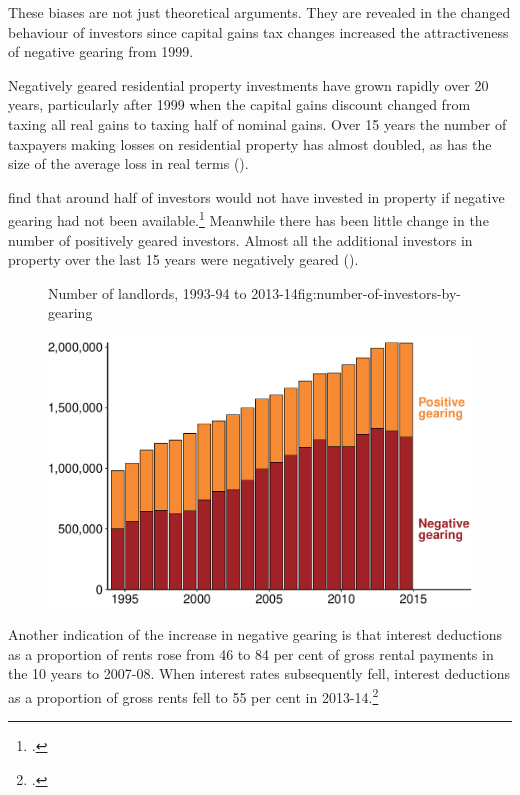 These biases are not just theoretical arguments. 
They are revealed in the changed behaviour of investors since capital gains tax changes increased the attractiveness of negative gearing from 1999.

Negatively geared residential property investments have grown rapidly over 20 years, particularly after 1999 when the capital gains discount changed from taxing all real gains to taxing half of nominal gains. 
Over 15 years the number of taxpayers making losses on residential property has almost doubled, as has the size of the average loss in real terms ().  






\textcite{seelig2009understanding} find that around half of investors would not have invested in property if negative gearing had not been available.\footcite[][63]{seelig2009understanding} 
Meanwhile there has been little change in the number of positively geared investors. Almost all the additional investors in property over the last 15 years were negatively geared ().

\begin{figure}[!t]
%
{Number of landlords, 1993-94 to 2013-14}{fig:number-of-investors-by-gearing}

\includegraphics[width=\columnwidth]{CGT-NG-atlas//number-of-investors-by-gearing-1}
\end{figure}

Another indication of the increase in negative gearing is that interest deductions as a proportion of rents rose from 46 to 84 per cent of gross rental payments in the 10 years to 2007-08. 
When interest rates subsequently fell, interest deductions as a proportion of gross rents fell to 55 per cent in 2013-14.\footcite[][65]{Treasury2015ReThink}


